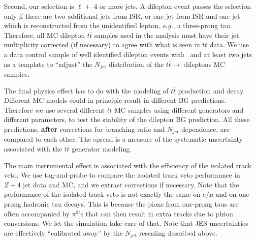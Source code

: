 Second, our selection is $\ell +$ 4 or more jets.  A dilepton event passes the selection only if there are 
two additional jets from ISR, or one jet from ISR and one jet which is reconstructed from the 
unidentified lepton, {\it e.g.}, a three-prong tau.  Therefore, all MC dilepton $t\bar{t}$ samples used
in the analysis must have their jet multiplicity corrected (if necessary) to agree with what is 
seen in $t\bar{t}$ data.  We use a data control sample of well identified dilepton events with
\met\ and at least two jets as a template to ``adjust'' the $N_{jet}$ distribution of the $t\bar{t} \to$
dileptons MC samples.

The final physics effect has to do with the modeling of $t\bar{t}$ production and decay.  Different
MC models could in principle result in different BG predictions.  Therefore we use several different 
$t\bar{t}$ MC samples using different generators and different parameters, to test the stability
of the dilepton BG prediction.  All these predictions, {\bf after} corrections for branching ratio
and $N_{jet}$ dependence, are compared to each other.  The spread is a measure of the systematic
uncertainty associated with the $t\bar{t}$ generator modeling.

The main instrumental effect is associated with the efficiency of the isolated track veto.
We use tag-and-probe to compare the isolated track veto performance in $Z + 4$ jet data and 
MC, and we extract corrections if necessary.  Note that the performance of the isolated track veto 
is not exactly the same on $e/\mu$ and on one prong hadronic tau decays.  This is because
the pions from one-prong taus are often accompanied by $\pi^0$'s that can then result in extra 
tracks due to phton conversions.  We let the simulation take care of that.  
Note that JES uncertainties are effectively ``calibrated away'' by the $N_{jet}$ rescaling described above.  




